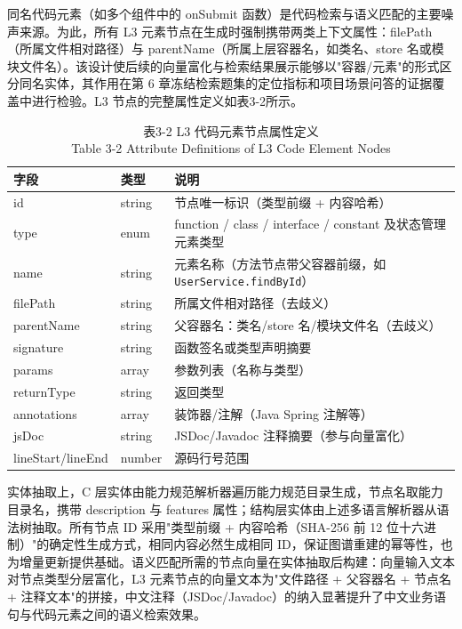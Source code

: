 同名代码元素（如多个组件中的 onSubmit 函数）是代码检索与语义匹配的主要噪声来源。为此，所有 L3 元素节点在生成时强制携带两类上下文属性：filePath（所属文件相对路径）与 parentName（所属上层容器名，如类名、store 名或模块文件名）。该设计使后续的向量富化与检索结果展示能够以"容器/元素"的形式区分同名实体，其作用在第 6 章冻结检索题集的定位指标和项目场景问答的证据覆盖中进行检验。L3 节点的完整属性定义如表3-2所示。

\begin{table}[htbp]
\centering
\small
\caption{表3-2 L3 代码元素节点属性定义\\Table 3-2 Attribute Definitions of L3 Code Element Nodes}
\begin{tabularx}{\textwidth}{|X|X|X|}
\hline
\textbf{字段} & \textbf{类型} & \textbf{说明} \\
\hline
id & string & 节点唯一标识（类型前缀 + 内容哈希） \\
type & enum & function / class / interface / constant 及状态管理元素类型 \\
name & string & 元素名称（方法节点带父容器前缀，如 \texttt{UserService.findById}） \\
filePath & string & 所属文件相对路径（去歧义） \\
parentName & string & 父容器名：类名/store 名/模块文件名（去歧义） \\
signature & string & 函数签名或类型声明摘要 \\
params & array & 参数列表（名称与类型） \\
returnType & string & 返回类型 \\
annotations & array & 装饰器/注解（Java Spring 注解等） \\
jsDoc & string & JSDoc/Javadoc 注释摘要（参与向量富化） \\
lineStart/lineEnd & number & 源码行号范围 \\
\hline
\end{tabularx}
\end{table}

实体抽取上，C 层实体由能力规范解析器遍历能力规范目录生成，节点名取能力目录名，携带 description 与 features 属性；结构层实体由上述多语言解析器从语法树抽取。所有节点 ID 采用"类型前缀 + 内容哈希（SHA-256 前 12 位十六进制）"的确定性生成方式，相同内容必然生成相同 ID，保证图谱重建的幂等性，也为增量更新提供基础。语义匹配所需的节点向量在实体抽取后构建：向量输入文本对节点类型分层富化，L3 元素节点的向量文本为"文件路径 + 父容器名 + 节点名 + 注释文本"的拼接，中文注释（JSDoc/Javadoc）的纳入显著提升了中文业务语句与代码元素之间的语义检索效果。

